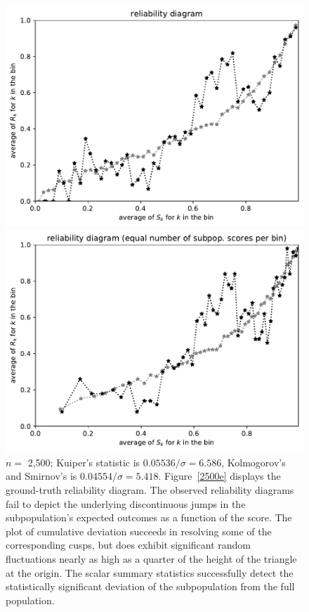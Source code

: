 \documentclass{article}
\begin{document}
\begin{figure}
\begin{centering}
\parbox{\imsize}{\includegraphics[width=\imsize]
                {./codes/unweighted/50000_2500_50_1/equiscore.pdf}}
\quad\quad
\parbox{\imsize}{\includegraphics[width=\imsize]
                {./codes/unweighted/50000_2500_50_1/equisamps.pdf}}

\end{centering}
\caption{$n =$ 2,500;
         Kuiper's statistic is $0.05536 / \sigma = 6.586$,
         Kolmogorov's and Smirnov's is $0.04554 / \sigma = 5.418$.
Figure~\ref{2500e} displays the ground-truth reliability diagram.
The observed reliability diagrams fail to depict
the underlying discontinuous jumps in the subpopulation's expected outcomes
as a function of the score. The plot of cumulative deviation succeeds
in resolving some of the corresponding cusps, but does exhibit significant
random fluctuations nearly as high as a quarter of the height of the triangle
at the origin.
The scalar summary statistics successfully
detect the statistically significant deviation
of the subpopulation from the full population.
}
\label{2500}
\end{figure}
\end{document}
